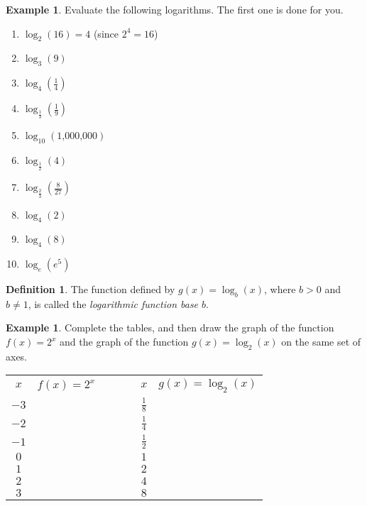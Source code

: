 \documentclass[letterpaper,12pt,oneside]{book}
\def\arraystretch{1.2}
\theoremstyle{definition}
\newtheorem{definition}[theorem]{Definition}
\newtheorem{example}[theorem]{Example}
\begin{document}
{\begin{example}
Evaluate the following logarithms.  The first one is done for you.
\begin{multicols}{2}
\begin{enumerate}
\item $\log_2(16)=4$ (since $2^4=16$)
\item $\log_3(9)$
\item $\log_4(\tfrac{1}{4})$
\item $\log_{\tfrac{1}{3}}(\tfrac{1}{9})$
\item $\log_{10}(\text{1,000,000})$
\item $\log_{\tfrac{1}{2}}(4)$
\item $\log_{\tfrac{2}{3}}(\tfrac{8}{27})$
\item $\log_4(2)$
\item $\log_4(8)$
\item $\log_e(e^{5})$
\end{enumerate}
\end{multicols}
\end{example}

\newpage

\begin{definition}
The function defined by $g(x)=\log_b(x)$, where $b>0$ and $b\neq 1$, is called the \emph{logarithmic function base $b$}.
\end{definition}

\begin{example}
Complete the tables, and then draw the graph of the function $f(x)=2^x$ and the graph of the function $g(x)=\log_2(x)$ on the same set of axes.
\begin{multicols}{2}

\begin{center}
\def\arraystretch{1.6}
\begin{tabular}{c |  c c c | c}
$x$ & $f(x)=2^x$ & \ \ \ \ &  $x$ &  $g(x)=\log_2(x)$\\\cline{1-2}\cline{4-5}
$-3$ & & & $\frac{1}{8}$\\
$-2$& & & $\frac{1}{4}$\\
$-1$& & & $\frac{1}{2}$\\
$0$& & & $1$\\
$1$& & & $2$\\
$2$& & & $4$\\
$3$ & & & $8$
\end{tabular}


\end{center}
\end{multicols}
\end{example}}
\end{document}
